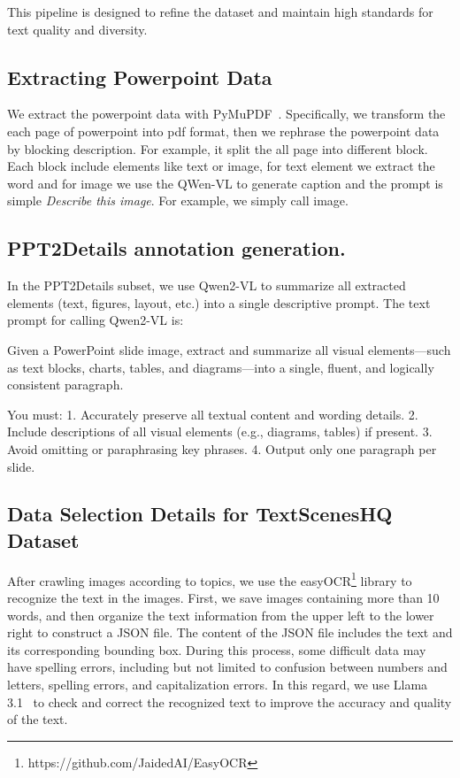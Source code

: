 This pipeline is designed to refine the dataset and maintain high standards for text quality and diversity.


\subsection{Extracting Powerpoint Data}
We extract the powerpoint data with PyMuPDF~\cite{pymupdf}.
Specifically, we transform the each page of powerpoint into pdf format, then we rephrase the powerpoint data by blocking description.
For example, it split the all page into different block.
Each block include elements like text or image, for text element we extract the word and for image we use the QWen-VL to generate caption and the prompt is simple \textit{Describe this image}.
For example, we simply call image.


\subsection{PPT2Details annotation generation.}
In the PPT2Details subset, we use Qwen2-VL to summarize all extracted elements (text, figures, layout, etc.) into a single descriptive prompt.
The text prompt for calling Qwen2-VL is:
\begin{tcolorbox}[title=Prompt Format]
Given a PowerPoint slide image, extract and summarize all visual elements—such as text blocks, charts, tables, and diagrams—into a single, fluent, and logically consistent paragraph. 

You must:  
1. Accurately preserve all textual content and wording details.  
2. Include descriptions of all visual elements (e.g., diagrams, tables) if present.  
3. Avoid omitting or paraphrasing key phrases.  
4. Output only one paragraph per slide.
\end{tcolorbox}


\subsection{Data Selection Details for TextScenesHQ Dataset}
After crawling images according to topics, we use the easyOCR\footnote{https://github.com/JaidedAI/EasyOCR} library to recognize the text in the images. 
First, we save images containing more than 10 words, and then organize the text information from the upper left to the lower right to construct a JSON file. 
The content of the JSON file includes the text and its corresponding bounding box.
During this process, some difficult data may have spelling errors, including but not limited to confusion between numbers and letters, spelling errors, and capitalization errors. 
In this regard, we use Llama 3.1~\cite{llama3h} to check and correct the recognized text to improve the accuracy and quality of the text.



